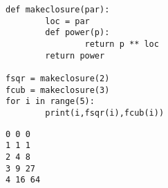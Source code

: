 \documentclass[11pt]{article}
\begin{document}
\begin{verbatim}
def makeclosure(par):
        loc = par
        def power(p):
                return p ** loc
        return power

fsqr = makeclosure(2)
fcub = makeclosure(3)
for i in range(5):
        print(i,fsqr(i),fcub(i))
\end{verbatim}

\begin{verbatim}
0 0 0
1 1 1
2 4 8
3 9 27
4 16 64
\end{verbatim}
\end{document}
